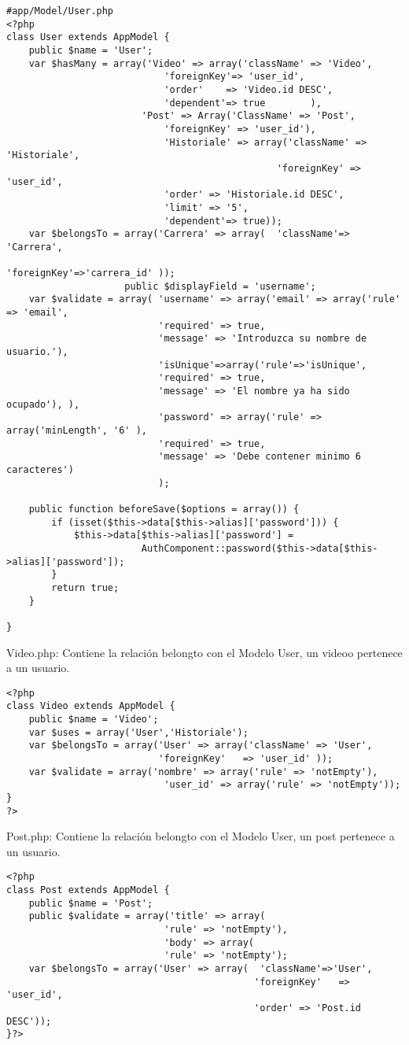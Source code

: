 \documentclass[12pt]{article}
\begin{document}
\footnotesize
\begin{verbatim}
#app/Model/User.php
<?php
class User extends AppModel {
    public $name = 'User';
	var $hasMany = array('Video' => array('className' => 'Video', 
                    		'foreignKey'=> 'user_id',
                      		'order'    => 'Video.id DESC',            
	   		         		'dependent'=> true        ),
		 	      		'Post' => Array('ClassName' => 'Post',
							'foreignKey' => 'user_id'),
							'Historiale' => array('className' => 'Historiale', 
												'foreignKey' => 'user_id',
							'order' => 'Historiale.id DESC',            
						    'limit' => '5',           
	                        'dependent'=> true));
	var $belongsTo = array('Carrera' => array(  'className'=> 'Carrera', 
												'foreignKey'=>'carrera_id' )); 
					 public $displayField = 'username';	
	var $validate = array( 'username' => array('email' => array('rule' => 'email',
	                       'required' => true, 
	                       'message' => 'Introduzca su nombre de usuario.'),
						   'isUnique'=>array('rule'=>'isUnique',
                           'required' => true, 
			               'message' => 'El nombre ya ha sido ocupado'), ),
						   'password' => array('rule' => array('minLength', '6' ),
	                       'required' => true,
                           'message' => 'Debe contener minimo 6 caracteres')
                           );

	public function beforeSave($options = array()) {
		if (isset($this->data[$this->alias]['password'])) {
			$this->data[$this->alias]['password'] = 
						AuthComponent::password($this->data[$this->alias]['password']);
		}
	    return true;
	}

}
\end{verbatim}

Video.php: Contiene la relación belongto con el Modelo User, un videoo pertenece a un usuario.\\
\footnotesize
\begin{verbatim}
<?php
class Video extends AppModel {
	public $name = 'Video';
    var $uses = array('User','Historiale');
	var $belongsTo = array('User' => array('className' => 'User', 
						   'foreignKey'   => 'user_id' ));  
	var $validate = array('nombre' => array('rule' => 'notEmpty'), 
							'user_id' => array('rule' => 'notEmpty'));
}
?>
\end{verbatim}

Post.php: Contiene la relación belongto con el Modelo User, un post pertenece a un usuario.\\
\footnotesize
\begin{verbatim}
<?php
class Post extends AppModel {
	public $name = 'Post';
	public $validate = array('title' => array(
	            			'rule' => 'notEmpty'),
					        'body' => array(
			            	'rule' => 'notEmpty');
	var $belongsTo = array('User' => array(  'className'=>'User', 
											'foreignKey'   => 'user_id',
											'order' => 'Post.id DESC'));
}?>
\end{verbatim}
\end{document}
